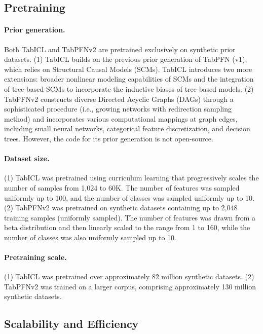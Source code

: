 \documentclass{article}
\theoremstyle{plain}
\theoremstyle{definition}
\theoremstyle{remark}
\begin{document}
\subsection{Pretraining}

\paragraph{Prior generation.} Both TabICL and TabPFNv2 are pretrained exclusively on synthetic prior datasets. (1) TabICL builds on the previous prior generation of TabPFN (v1), which relies on Structural Causal Models (SCMs). TabICL introduces two more extensions: broader nonlinear modeling capabilities of SCMs and the integration of tree-based SCMs to incorporate the inductive biases of tree-based models. (2) TabPFNv2 constructs diverse Directed Acyclic Graphs (DAGs) through a sophisticated procedure (i.e., growing networks with redirection sampling method) and incorporates various computational mappings at graph edges, including small neural networks, categorical feature discretization, and decision trees. However, the code for its prior generation is not open-source.

\paragraph{Dataset size.} (1) TabICL was pretrained using curriculum learning that progressively scales the number of samples from 1,024 to 60K. The number of features was sampled uniformly up to 100, and the number of classes was sampled uniformly up to 10. (2) TabPFNv2 was pretrained on synthetic datasets containing up to 2,048 training samples (uniformly sampled). The number of features was drawn from a beta distribution and then linearly scaled to the range from 1 to 160, while the number of classes was also uniformly sampled up to 10.

\paragraph{Pretraining scale.} (1) TabICL was pretrained over approximately 82 million synthetic datasets. (2) TabPFNv2 was trained on a larger corpus, comprising approximately 130 million synthetic datasets.

\subsection{Scalability and Efficiency}
\end{document}
